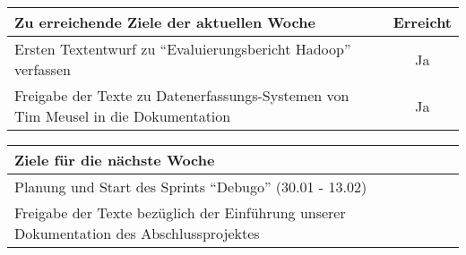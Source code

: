 \begin{tabularx}{\textwidth}{Xc}
    \arrayrulecolor{OliveGreen}
    \toprule
    {\bfseries Zu erreichende Ziele der aktuellen Woche} & {\bfseries Erreicht} \\
    \midrule[2pt]
    Ersten Textentwurf zu ``Evaluierungsbericht Hadoop'' verfassen  &  Ja  \\
    \rowcolor{OliveGreen!15}
    Freigabe der Texte zu Datenerfassungs-Systemen von Tim Meusel in die
    Dokumentation  &  Ja  \\
    \bottomrule[2pt]
\end{tabularx}
%
\vspace{1cm}
%
\begin{tabularx}{\textwidth}{Xc}
    \arrayrulecolor{OliveGreen}
    \toprule
    {\bfseries Ziele für die nächste Woche}              &                      \\
    \midrule[2pt]
    Planung und Start des Sprints ``Debugo'' (30.01 - 13.02)  &  \\
    \rowcolor{OliveGreen!15}
    Freigabe der Texte bezüglich der Einführung unserer Dokumentation des
    Abschlussprojektes  &  \\
\end{tabularx}
